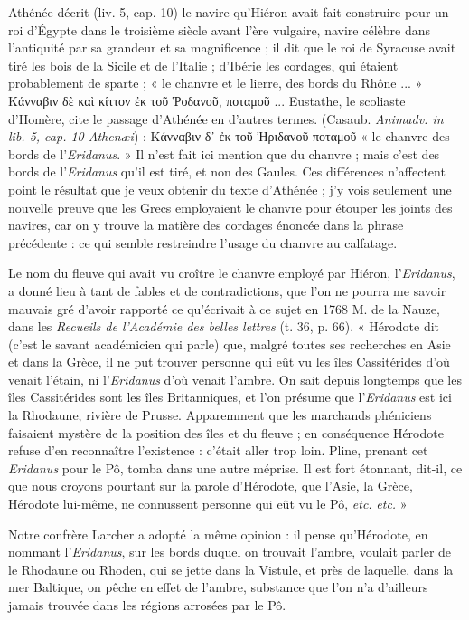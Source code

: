 \documentclass[a4paper, 11pt, oneside, polutonikogreek]{article}
\begin{document}
Athénée décrit (liv. 5, cap. 10) le navire qu'Hiéron avait fait construire pour un roi d'Égypte dans le troisième siècle avant l'ère vulgaire, navire célèbre dans l'antiquité par sa grandeur et sa magnificence ; il dit que le roi de Syracuse avait tiré les bois de la Sicile et de l'Italie ; d'Ibérie les cordages, qui étaient probablement de sparte ; « le chanvre et le lierre, des bords du Rhône ... » Κάνναβιν δὲ καὶ κίττον ἐκ τοῦ Ῥοδανοῦ, ποταμοῦ ... Eustathe, le scoliaste d'Homère, cite le passage d'Athénée en d'autres termes. (Casaub. \emph{Animadv. in lib. 5, cap. 10 Athenæi}) : Κάνναβιν δ᾽ ἐκ τοῦ Ἠριδανοῦ ποταμοῦ « le chanvre des bords de l'\emph{Eridanus}. » Il n'est fait ici mention que du chanvre ; mais c'est des bords de l'\emph{Eridanus} qu'il est tiré, et non des Gaules. Ces différences n'affectent point le résultat que je veux obtenir du texte d'Athénée ; j'y vois seulement une nouvelle preuve que les Grecs employaient le chanvre pour étouper les joints des navires, car on y trouve la matière des cordages énoncée dans la phrase précédente : ce qui semble restreindre l'usage du chanvre au calfatage.

Le nom du fleuve qui avait vu croître le chanvre employé par Hiéron, l'\emph{Eridanus}, a donné lieu à tant de fables et de contradictions, que l'on ne pourra me savoir mauvais gré d'avoir rapporté ce qu'écrivait à ce sujet en 1768 M. de la Nauze, dans les \emph{Recueils de l'Académie des belles lettres} (t. 36, p. 66). « Hérodote dit (c'est le savant académicien qui parle) que, malgré toutes ses recherches en Asie et dans la Grèce, il ne put trouver personne qui eût vu les îles Cassitérides d'où venait l'étain, ni l'\emph{Eridanus} d'où venait l'ambre. On sait depuis longtemps que les îles Cassitérides sont les îles Britanniques, et l'on présume que l'\emph{Eridanus} est ici la Rhodaune, rivière de Prusse. Apparemment que les marchands phéniciens faisaient mystère de la position des îles et du fleuve ; en conséquence Hérodote refuse d'en reconnaître l'existence : c'était aller trop loin. Pline, prenant cet \emph{Eridanus} pour le Pô, tomba dans une autre méprise. Il est fort étonnant, dit-il, ce que nous croyons pourtant sur la parole d'Hérodote, que l'Asie, la Grèce, Hérodote lui-même, ne connussent personne qui eût vu le Pô, \emph{etc.} \emph{etc.} »

Notre confrère Larcher a adopté la même opinion : il pense qu'Hérodote, en nommant l'\emph{Eridanus}, sur les bords duquel on trouvait l'ambre, voulait parler de le Rhodaune ou Rhoden, qui se jette dans la Vistule, et près de laquelle, dans la mer Baltique, on pêche en effet de l'ambre, substance que l'on n'a d'ailleurs jamais trouvée dans les régions arrosées par le Pô.
\end{document}
